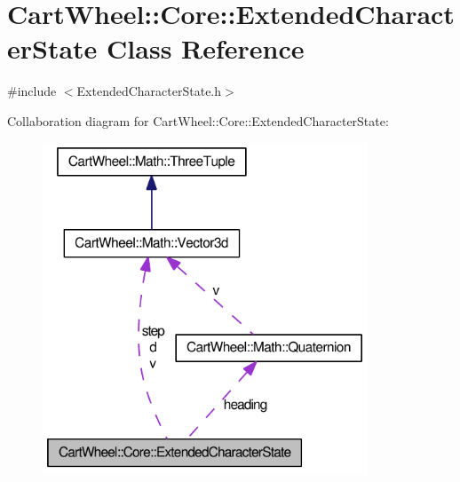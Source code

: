 \hypertarget{classCartWheel_1_1Core_1_1ExtendedCharacterState}{
\section{CartWheel::Core::ExtendedCharacterState Class Reference}
\label{classCartWheel_1_1Core_1_1ExtendedCharacterState}
}


{\ttfamily \#include $<$ExtendedCharacterState.h$>$}



Collaboration diagram for CartWheel::Core::ExtendedCharacterState:\nopagebreak
\begin{figure}[H]
\begin{center}
\leavevmode
\includegraphics[width=274pt]{classCartWheel_1_1Core_1_1ExtendedCharacterState__coll__graph}
\end{center}
\end{figure}
